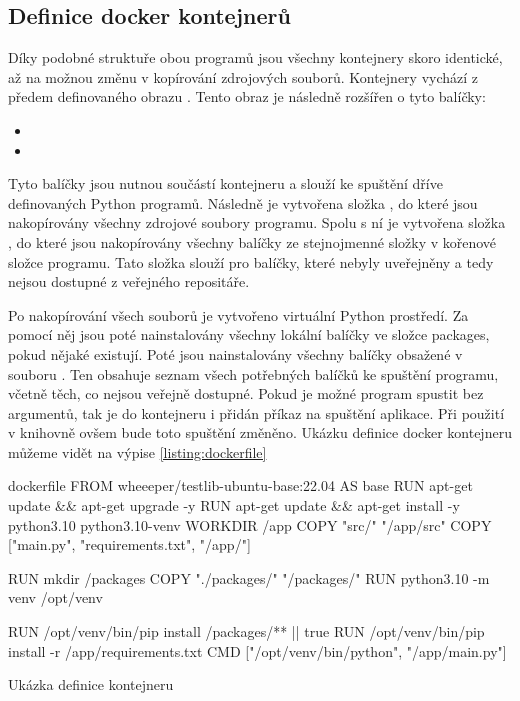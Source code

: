 \subsection{Definice docker kontejnerů}

Díky podobné struktuře obou programů jsou všechny kontejnery skoro identické, až na možnou změnu v kopírování zdrojových souborů. Kontejnery vychází z předem definovaného obrazu . Tento obraz je následně rozšířen o tyto balíčky:

\begin{itemize}
    \item {}
    \item {}
\end{itemize}

Tyto balíčky jsou nutnou součástí kontejneru a slouží ke spuštění dříve definovaných Python programů. Následně je vytvořena složka , do které jsou nakopírovány všechny zdrojové soubory programu. Spolu s ní je vytvořena složka , do které jsou nakopírovány všechny balíčky ze stejnojmenné složky v kořenové složce programu. Tato složka slouží pro balíčky, které nebyly uveřejněny a tedy nejsou dostupné z veřejného repositáře.

Po nakopírování všech souborů je vytvořeno virtuální Python prostředí. Za pomocí něj jsou poté nainstalovány všechny lokální balíčky ve složce packages, pokud nějaké existují. Poté jsou nainstalovány všechny balíčky obsažené v souboru . Ten obsahuje seznam všech potřebných balíčků ke spuštění programu, včetně těch, co nejsou veřejně dostupné. Pokud je možné program spustit bez argumentů, tak je do kontejneru i přidán příkaz na spuštění aplikace. Při použití v knihovně ovšem bude toto spuštění změněno. Ukázku definice docker kontejneru můžeme vidět na výpise \ref{listing:dockerfile}

\begin{listing}[htbp]
    \centering
    \begin{cminted}[breaklines,autogobble, fontsize=\footnotesize]{dockerfile}
FROM wheeeper/testlib-ubuntu-base:22.04 AS base
RUN apt-get update && apt-get upgrade -y
RUN apt-get update && apt-get install -y python3.10 python3.10-venv
WORKDIR /app
COPY "src/" "/app/src"
COPY ["main.py", "requirements.txt", "/app/"]

RUN mkdir /packages
COPY "./packages/" "/packages/"
RUN python3.10 -m venv /opt/venv

RUN /opt/venv/bin/pip install  /packages/** || true
RUN /opt/venv/bin/pip install -r /app/requirements.txt 
CMD ["/opt/venv/bin/python", "/app/main.py"]
    \end{cminted}
\caption{Ukázka definice kontejneru}
\label{listing:dockerfile}
\end{listing}

